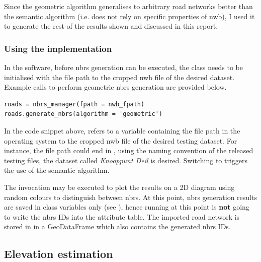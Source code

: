 Since the geometric algorithm generalises to arbitrary road networks better than the semantic algorithm (i.e. does not rely on specific properties of \ac{nwb}), I used it to generate the rest of the results shown and discussed in this report.

\subsubsection{Using the implementation}

In the software, before \ac{nbrs} generation can be executed, the  class needs to be initialised with the file path to the cropped \ac{nwb} file of the desired dataset. Example calls to perform geometric \ac{nbrs} generation are provided below.

\begin{verbatim}
roads = nbrs_manager(fpath = nwb_fpath)
roads.generate_nbrs(algorithm = 'geometric')
\end{verbatim}

In the code snippet above,  refers to a variable containing the file path in the operating system to the cropped \ac{nwb} file of the desired testing dataset. For instance, the file path could end in , using the naming convention of the released testing files, the dataset called \textit{Knooppunt Deil} is desired. Switching to  triggers the use of the semantic algorithm.

The invocation  may be executed to plot the results on a 2D diagram using random colours to distinguish between \ac{nbrs}. At this point, \ac{nbrs} generation results are saved in class variables only (see ), hence running  at this point is \textbf{not} going to write the \ac{nbrs} IDs into the attribute table. The imported road network is stored in  in a GeoDataFrame which also contains the generated \ac{nbrs} IDs.

\subsection{Elevation estimation}
\label{sub:r_elevationestimation}


